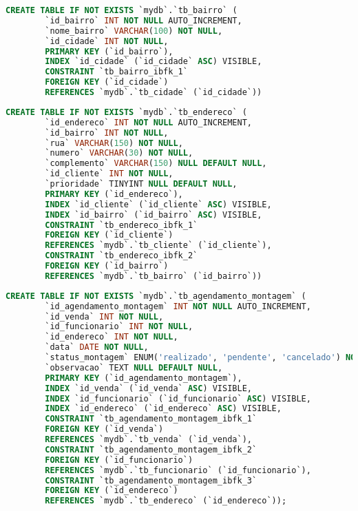 \documentclass[
12pt,
a4paper,
semrecuonosumario,
sumario = abnt-6027-2012]{report}
\begin{document}
    \begin{lstlisting}[language=SQL,caption={DDL -- Tabela \texttt{tb\_bairro}}]
    	CREATE TABLE IF NOT EXISTS `mydb`.`tb_bairro` (
    	`id_bairro` INT NOT NULL AUTO_INCREMENT,
    	`nome_bairro` VARCHAR(100) NOT NULL,
    	`id_cidade` INT NOT NULL,
    	PRIMARY KEY (`id_bairro`),
    	INDEX `id_cidade` (`id_cidade` ASC) VISIBLE,
    	CONSTRAINT `tb_bairro_ibfk_1`
    	FOREIGN KEY (`id_cidade`)
    	REFERENCES `mydb`.`tb_cidade` (`id_cidade`))
    \end{lstlisting}
    \begin{lstlisting}[language=SQL,caption={DDL -- Tabela \texttt{tb\_endereco}}]
    	CREATE TABLE IF NOT EXISTS `mydb`.`tb_endereco` (
    	`id_endereco` INT NOT NULL AUTO_INCREMENT,
    	`id_bairro` INT NOT NULL,
    	`rua` VARCHAR(150) NOT NULL,
    	`numero` VARCHAR(30) NOT NULL,
    	`complemento` VARCHAR(150) NULL DEFAULT NULL,
    	`id_cliente` INT NOT NULL,
    	`prioridade` TINYINT NULL DEFAULT NULL,
    	PRIMARY KEY (`id_endereco`),
    	INDEX `id_cliente` (`id_cliente` ASC) VISIBLE,
    	INDEX `id_bairro` (`id_bairro` ASC) VISIBLE,
    	CONSTRAINT `tb_endereco_ibfk_1`
    	FOREIGN KEY (`id_cliente`)
    	REFERENCES `mydb`.`tb_cliente` (`id_cliente`),
    	CONSTRAINT `tb_endereco_ibfk_2`
    	FOREIGN KEY (`id_bairro`)
    	REFERENCES `mydb`.`tb_bairro` (`id_bairro`))
    \end{lstlisting}
    \begin{lstlisting}[language=SQL,caption={DDL -- Tabela \texttt{tb\_agendamento\_montagem}}]
    	CREATE TABLE IF NOT EXISTS `mydb`.`tb_agendamento_montagem` (
    	`id_agendamento_montagem` INT NOT NULL AUTO_INCREMENT,
    	`id_venda` INT NOT NULL,
    	`id_funcionario` INT NOT NULL,
    	`id_endereco` INT NOT NULL,
    	`data` DATE NOT NULL,
    	`status_montagem` ENUM('realizado', 'pendente', 'cancelado') NOT NULL,
    	`observacao` TEXT NULL DEFAULT NULL,
    	PRIMARY KEY (`id_agendamento_montagem`),
    	INDEX `id_venda` (`id_venda` ASC) VISIBLE,
    	INDEX `id_funcionario` (`id_funcionario` ASC) VISIBLE,
    	INDEX `id_endereco` (`id_endereco` ASC) VISIBLE,
    	CONSTRAINT `tb_agendamento_montagem_ibfk_1`
    	FOREIGN KEY (`id_venda`)
    	REFERENCES `mydb`.`tb_venda` (`id_venda`),
    	CONSTRAINT `tb_agendamento_montagem_ibfk_2`
    	FOREIGN KEY (`id_funcionario`)
    	REFERENCES `mydb`.`tb_funcionario` (`id_funcionario`),
    	CONSTRAINT `tb_agendamento_montagem_ibfk_3`
    	FOREIGN KEY (`id_endereco`)
    	REFERENCES `mydb`.`tb_endereco` (`id_endereco`));
    \end{lstlisting}
\end{document}
